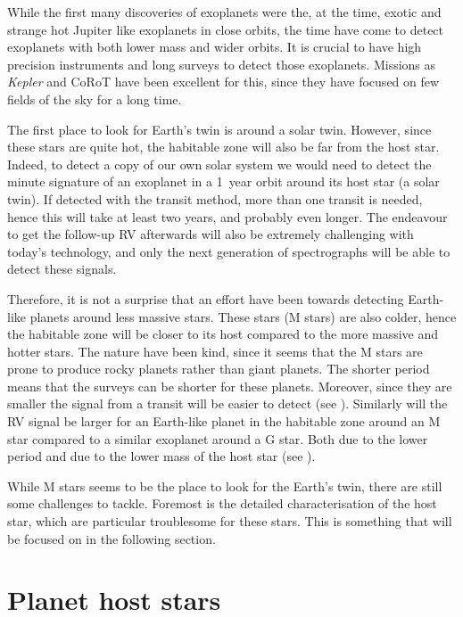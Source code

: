 While the first many discoveries of exoplanets were the, at the time, exotic and strange hot Jupiter
like exoplanets in close orbits, the time have come to detect exoplanets with both lower mass and
wider orbits. It is crucial to have high precision instruments and long surveys to detect those
exoplanets. Missions as \emph{Kepler} and CoRoT have been excellent for this, since they have
focused on few fields of the sky for a long time.

The first place to look for Earth's twin is around a solar twin. However, since these stars are
quite hot, the habitable zone will also be far from the host star. Indeed, to detect a copy of our
own solar system we would need to detect the minute signature of an exoplanet in a \SI{1}{year}
orbit around its host star (a solar twin). If detected with the transit method, more than one
transit is needed, hence this will take at least two years, and probably even longer. The endeavour
to get the follow-up RV afterwards will also be extremely challenging with today's technology, and
only the next generation of spectrographs will be able to detect these signals.

Therefore, it is not a surprise that an effort have been towards detecting Earth-like planets around
less massive stars. These stars (M stars) are also colder, hence the habitable zone will be closer
to its host compared to the more massive and hotter stars. The nature have been kind, since it seems
that the M stars are prone to produce rocky planets rather than giant planets. The shorter period means that the surveys can be shorter for these planets.
Moreover, since they are smaller the signal from a transit will be easier to detect (see
). Similarly will the RV signal be larger for an Earth-like planet in the habitable
zone around an M star compared to a similar exoplanet around a G star. Both due to the lower period
and due to the lower mass of the host star (see ).

While M stars seems to be the place to look for the Earth's twin, there are still some challenges to
tackle. Foremost is the detailed characterisation of the host star, which are particular troublesome
for these stars. This is something that will be focused on in the following section.




\section{Planet host stars}
\label{sec:planet_host_stars}

